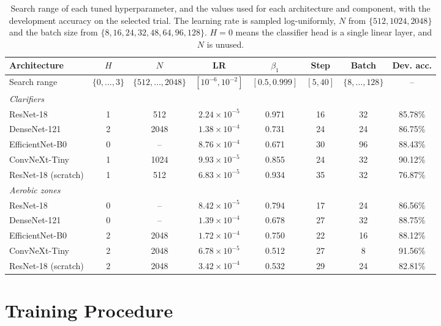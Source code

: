 \begin{table}[htbp]
\centering
\caption{Search range of each tuned hyperparameter, and the values used for each architecture and component, with the development accuracy on the selected trial. The learning rate is sampled log-uniformly, $N$ from $\{512, 1024, 2048\}$ and the batch size from $\{8, 16, 24, 32, 48, 64, 96, 128\}$. $H{=}0$ means the classifier head is a single linear layer, and $N$ is unused.}
\label{tab:hyperparams}
\setlength{\tabcolsep}{2.2pt}
\begin{tabular}{lccccccc}
\toprule
\textbf{Architecture} & \textbf{$H$} & \textbf{$N$} & \textbf{LR} & \textbf{$\beta_1$} & \textbf{Step} & \textbf{Batch} & \textbf{Dev. acc.} \\
\midrule
Search range & $\{0,\ldots,3\}$ & $\{512,\ldots,2048\}$ & $[10^{-6},10^{-2}]$ & $[0.5,0.999]$ & $[5,40]$ & $\{8,\ldots,128\}$ & -- \\
\midrule
\multicolumn{8}{l}{\emph{Clarifiers}} \\
ResNet-18               & 1 & 512  & $2.24\times10^{-5}$ & 0.971 & 16 & 32 & 85.78\% \\
DenseNet-121            & 2 & 2048 & $1.38\times10^{-4}$ & 0.731 & 24 & 24 & 86.75\% \\
EfficientNet-B0         & 0 & --   & $8.76\times10^{-4}$ & 0.671 & 30 & 96 & 88.43\% \\
ConvNeXt-Tiny           & 1 & 1024 & $9.93\times10^{-5}$ & 0.855 & 24 & 32 & 90.12\% \\
ResNet-18 (scratch)     & 1 & 512  & $6.83\times10^{-5}$ & 0.934 & 35 & 32 & 76.87\% \\
\midrule
\multicolumn{8}{l}{\emph{Aerobic zones}} \\
ResNet-18               & 0 & --   & $8.42\times10^{-5}$ & 0.794 & 17 & 24 & 86.56\% \\
DenseNet-121            & 0 & --   & $1.39\times10^{-4}$ & 0.678 & 27 & 32 & 88.75\% \\
EfficientNet-B0         & 2 & 2048 & $1.72\times10^{-4}$ & 0.750 & 22 & 16 & 88.12\% \\
ConvNeXt-Tiny           & 2 & 2048 & $6.78\times10^{-5}$ & 0.512 & 27 & 8  & 91.56\% \\
ResNet-18 (scratch)     & 2 & 2048 & $3.42\times10^{-4}$ & 0.532 & 29 & 24 & 82.81\% \\
\bottomrule
\end{tabular}
\end{table}

\section{Training Procedure}
\label{sec:exp_training}

